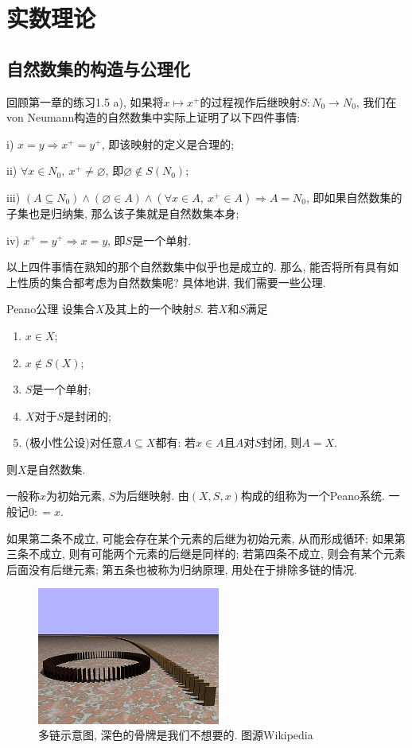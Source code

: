 \chapter{实数理论}

\section{自然数集的构造与公理化}

回顾第一章的练习1.5 a), 如果将$x \mapsto x^+$的过程视作后继映射$S: N_0 \to N_0$, 我们在von Neumann构造的自然数集中实际上证明了以下四件事情: 

i) $x=y \Rightarrow x^+ = y^+$, 即该映射的定义是合理的; 

ii) $\forall x \in N_0, ~x^+ \neq \varnothing$, 即$\varnothing \notin S(N_0)$; 

iii) $(A \subseteq N_0) \wedge (\varnothing \in A) \wedge (\forall x \in A, ~x^+ \in A) \Rightarrow A=N_0$, 即如果自然数集的子集也是归纳集, 那么该子集就是自然数集本身; 

iv) $x^+=y^+ \Rightarrow x=y$, 即$S$是一个单射.

以上四件事情在熟知的那个自然数集中似乎也是成立的. 那么, 能否将所有具有如上性质的集合都考虑为自然数集呢? 具体地讲, 我们需要一些公理.

\begin{axiom}{Peano公理}
	设集合$X$及其上的一个映射$S$. 若$X$和$S$满足
	\begin{enumerate}
		\item $x \in X$; 
		\item $x \notin S(X)$; 
		\item $S$是一个单射; 
		\item $X$对于$S$是封闭的; 
		\item (极小性公设)对任意$A \subseteq X$都有: 若$x \in A$且$A$对$S$封闭, 则$A=X$. 
	\end{enumerate}
	则$X$是自然数集. 
\end{axiom}
\begin{remark}
	一般称$x$为初始元素, $S$为后继映射. 由$(X, S, x)$构成的组称为一个Peano系统. 一般记$0: =x$.
\end{remark}

如果第二条不成立, 可能会存在某个元素的后继为初始元素, 从而形成循环; 如果第三条不成立, 则有可能两个元素的后继是同样的; 若第四条不成立, 则会有某个元素后面没有后继元素; 第五条也被称为归纳原理, 用处在于排除多链的情况. 

\begin{figure}[h!]
	\centering
	\includegraphics[width=6cm]{attachment/440px-Domino_effect_visualizing_exclusion_of_junk_term_by_induction_axiom.jpg}
	\caption{多链示意图, 深色的骨牌是我们不想要的. 图源Wikipedia}
\end{figure}



